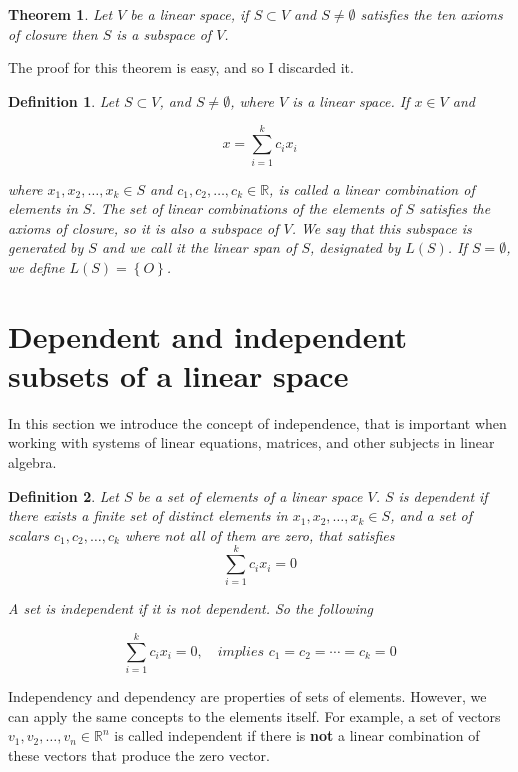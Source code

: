 \documentclass{book}
\newtheorem{theorem}{Theorem}[section]
\newtheorem{definition}{Definition}[section]
\begin{document}
\begin{theorem}
    Let $V$ be a linear space, if $S\subset V$ and $S \neq \emptyset$ satisfies
    the ten axioms of closure then $S$ is a subspace of $V$.
\end{theorem}

The proof for this theorem is easy, and so I discarded it.

\begin{definition}
    Let $S\subset V$, and $S\neq \emptyset$, where $V$ is a linear space. If $x\in V$ and

    \[
        x=\sum_{i=1}^{k}{c_i x_i}
    \]

    where $x_1,x_2,\dots,x_k \in S$ and $c_1,c_2,\dots,c_k\in \mathbb{R}$, is
    called a \textit{linear combination of elements in $S$}. The set of linear
    combinations of the elements of $S$ satisfies the axioms of closure, so it is
    also a subspace of $V$.\textit{ We say that this subspace is generated by $S$
        and we call it the linear span of $S$, designated by $L(S)$.} If $S=\emptyset$,
    we define $L(S)=\left\{O\right\}$.
\end{definition}

\section{Dependent and independent subsets of a linear space}

In this section we introduce the concept of independence, that is important
when working with systems of linear equations, matrices, and other subjects in
linear algebra.

\begin{definition}
    Let $S$ be a set of elements of a linear space $V$. $S$ is dependent if there
    exists a finite set of distinct elements in $x_1,x_2,\dots,x_k\in S$, and a
    set of scalars $c_1,c_2,\dots,c_k$ where not all of them are zero, that satisfies
    \[
        \sum_{i=1}^{k}{c_i x_i} = 0
    \]

    A set is independent if it is not dependent. So the following

    \[
        \sum_{i=1}^{k}{c_i x_i} = 0, \quad \textit{implies } c_1 = c_2 = \cdots = c_k =0
    \]
\end{definition}

Independency and dependency are properties of sets of elements. However, we can
apply the same concepts to the elements itself. For example, a set of vectors
$v_1, v_2, \dots, v_n \in \mathbb R^{n}$ is called independent if there is
\textbf{not} a linear combination of these vectors that produce the zero
vector.
\end{document}
